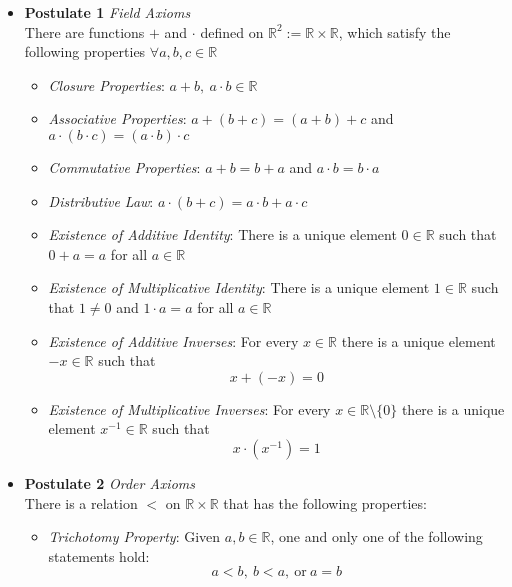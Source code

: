 \documentclass[11pt,a4paper]{article}
\begin{document}
\begin{itemize}
    \item \textbf{Postulate 1} \emph{Field Axioms} \\
        There are functions $+$ and $\cdot$ defined on
        $\mathbb{R}^2 := \mathbb{R} \times \mathbb{R}$,
        which satisfy the following properties $\forall a, b, c \in \mathbb{R}$

        \begin{itemize}
            \item \emph{Closure Properties}:
                $a + b, \ a \cdot b \in \mathbb{R}$

            \item \emph{Associative Properties}:
                $a + (b + c) = (a + b) + c$ and
                $a \cdot (b \cdot c) = (a \cdot b) \cdot c$

            \item \emph{Commutative Properties}:
                $a + b = b + a$ and $a \cdot b = b \cdot a$

            \item \emph{Distributive Law}:
                $a \cdot (b + c) = a \cdot b + a \cdot c$

            \item \emph{Existence of Additive Identity}:
                There is a unique element $0 \in \mathbb{R}$ such that
                $0 + a = a$ for all $a \in \mathbb{R}$

            \item \emph{Existence of Multiplicative Identity}:
                There is a unique element $1 \in \mathbb{R}$ such that
                $1 \neq 0$ and $1 \cdot a = a$ for all $a \in \mathbb{R}$

            \item \emph{Existence of Additive Inverses}:
                For every $x \in \mathbb{R}$ there is a unique element $-x \in \mathbb{R}$ such that
                \[
                    x + (-x) = 0
                \]

            \item \emph{Existence of Multiplicative Inverses}:
                For every $x \in \mathbb{R} \setminus \{0\}$ there is a unique element
                $x^{-1} \in \mathbb{R}$ such that
                \[
                    x \cdot (x^{-1}) = 1
                \]
        \end{itemize}

    \item \textbf{Postulate 2} \emph{Order Axioms} \\
        There is a relation $<$ on $\mathbb{R} \times \mathbb{R}$ that has the following
        properties:
        \begin{itemize}
            \item \emph{Trichotomy Property}:
                Given $a, b \in \mathbb{R}$, one and only one of the following statements hold:
                \[
                    a < b, \ b < a, \ \text{or} \ a = b
                \]


\end{itemize}
\end{itemize}
\end{document}
